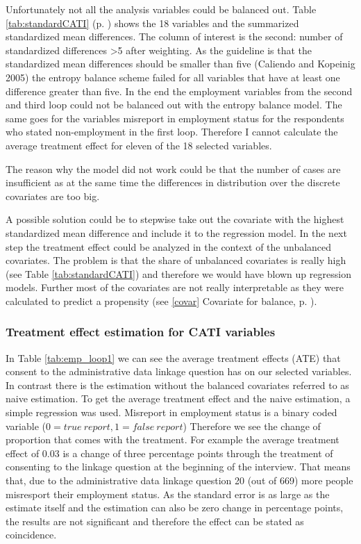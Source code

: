 Unfortunately not all the analysis variables could be balanced out. Table \ref{tab:standardCATI} (p. \pageref{tab:standardCATI}) shows the 18 variables and the summarized standardized mean differences. The column of interest is the second: number of standardized differences \textgreater5 after weighting. As the guideline is that the standardized mean differences should be smaller than five (Caliendo and Kopeinig 2005) the entropy balance scheme failed for all variables that have at least one difference greater than five. In the end the employment variables from the second and third loop could not be balanced out with the entropy balance model. The same goes for the variables misreport in employment status for the respondents who stated non-employment in the first loop. Therefore I cannot calculate the average treatment effect for eleven of the 18 selected variables. 

The reason why the model did not work could be that the number of cases are insufficient as at the same time the differences in distribution over the discrete covariates are too big.  

A possible solution could be to stepwise take out the covariate with the highest standardized mean difference and include it to the regression model. In the next step the treatment effect could be analyzed in the context of the unbalanced covariates. The problem is that the share of unbalanced covariates is really high (see Table \ref{tab:standardCATI}) and therefore we would have blown up regression models. Further most of the covariates are not really interpretable as they were calculated to predict a propensity (see \ref{covar} Covariate for balance, p. \pageref{covar}).



\subsubsection{Treatment effect estimation for CATI variables}

In Table \ref{tab:emp_loop1} we can see the average treatment effects (ATE) that consent to the administrative data linkage question has on our selected variables. In contrast there is the estimation without the balanced covariates referred to as naive estimation. To get the average treatment effect and the naive estimation, a simple regression was used. Misreport in employment status is a binary coded variable (\(0=true\ report, 1=false \ report\)) Therefore we see the change of proportion that comes with the treatment. For example the average treatment effect of 0.03 is a change of three percentage points through the treatment of consenting to the linkage question at the beginning of the interview. That means that, due to the administrative data linkage question 20 (out of 669) more people misresport their employment status. As the standard error is as large as the estimate itself and the estimation can also be zero change in percentage points, the results are not significant and therefore the effect can be stated as coincidence. 


